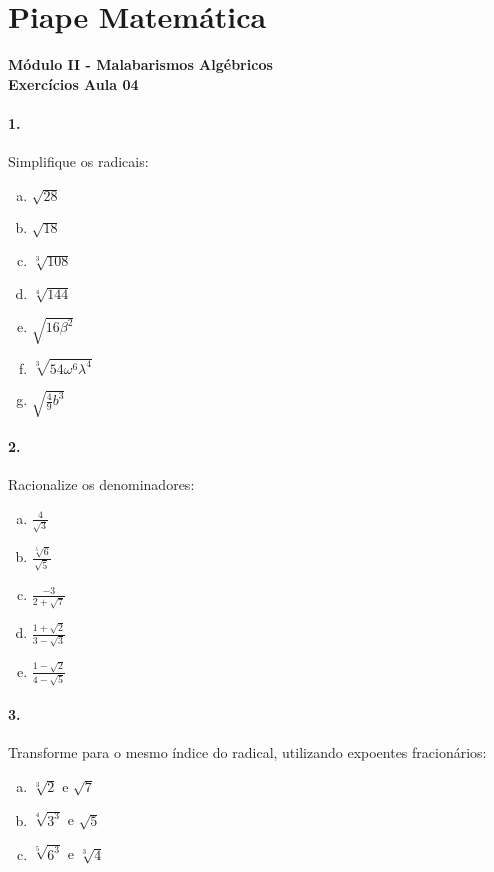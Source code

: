 \documentclass[a4paper,12pt]{article}
\begin{document}
 
  
\section*{Piape Matemática} 
\textbf{Módulo II - Malabarismos Algébricos}\\
\textbf{Exercícios Aula 04}         
\begin{multicols}{2}
\paragraph{1.} Simplifique os radicais:
\begin{enumerate}[a)]
    \item $\sqrt{28}$ 
    \item $\sqrt{18}$
    \item $\sqrt[3]{108}$
    \item $\sqrt[4]{144}$
    \item $\sqrt{16\beta^2}$
    \item $\sqrt[3]{54\omega^6\lambda^4}$
    \item $\sqrt{\frac{4}{9}b^3}$ 
\end{enumerate} 

\paragraph*{2.} Racionalize os denominadores:
\begin{enumerate}[a)]
    \item $\displaystyle\frac{4}{\sqrt{3}}$
    \item $\displaystyle\frac{\sqrt[5]{6}}{\sqrt{5}}$
    \item $\displaystyle\frac{-3}{2+\sqrt{7}}$
    \item $\displaystyle\frac{1+\sqrt{2}}{3-\sqrt{3}}$
    \item $\displaystyle\frac{1-\sqrt{2}}{4-\sqrt{5}}$
\end{enumerate}
 
\paragraph*{3.} Transforme para o mesmo índice do radical, utilizando expoentes fracionários:
\begin{enumerate}[a)]
    \item $\sqrt[3]{2}$ e $\sqrt{7}$
    \item $\sqrt[4]{{3^3}}$ e $\sqrt{5}$
    \item $\sqrt[5]{6^3}$ e $\sqrt[3]{4}$
\end{enumerate}


\end{multicols}
\end{document}
